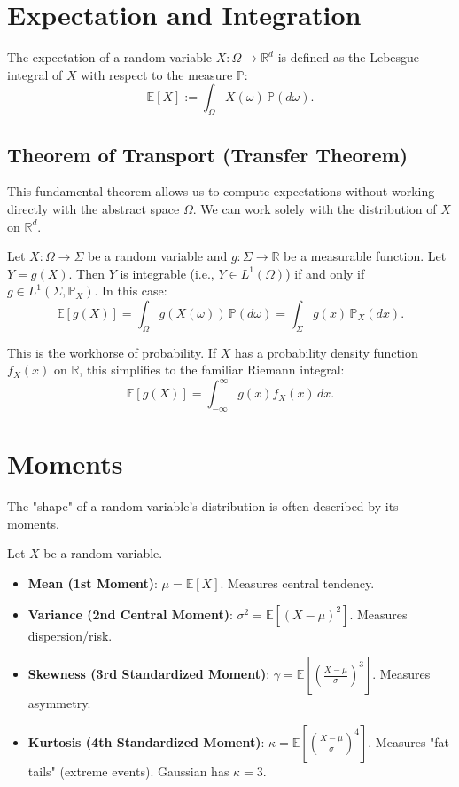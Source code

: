\section{Expectation and Integration}

\begin{definition}[Expectation]
The expectation of a random variable $X: \Omega \to \mathbb{R}^d$ is defined as the Lebesgue integral of $X$ with respect to the measure $\mathbb{P}$:
\[
\mathbb{E}[X] := \int_{\Omega} X(\omega) \, \mathbb{P}(d\omega).
\]
\end{definition}

\subsection{Theorem of Transport (Transfer Theorem)}
This fundamental theorem allows us to compute expectations without working directly with the abstract space $\Omega$. We can work solely with the distribution of $X$ on $\mathbb{R}^d$.

\begin{theorem}
Let $X: \Omega \to \Sigma$ be a random variable and $g: \Sigma \to \mathbb{R}$ be a measurable function. Let $Y = g(X)$. Then $Y$ is integrable (i.e., $Y \in L^1(\Omega)$) if and only if $g \in L^1(\Sigma, \mathbb{P}_X)$. In this case:
\[
\mathbb{E}[g(X)] = \int_{\Omega} g(X(\omega)) \, \mathbb{P}(d\omega) = \int_{\Sigma} g(x) \, \mathbb{P}_X(dx).
\]
\end{theorem}
This is the workhorse of probability. If $X$ has a probability density function $f_X(x)$ on $\mathbb{R}$, this simplifies to the familiar Riemann integral:
\[
\mathbb{E}[g(X)] = \int_{-\infty}^{\infty} g(x) f_X(x) \, dx.
\]

\section{Moments}
The "shape" of a random variable's distribution is often described by its moments.
\begin{definition}[Moments]
Let $X$ be a random variable.
\begin{itemize}
    \item \textbf{Mean (1st Moment)}: $\mu = \mathbb{E}[X]$. Measures central tendency.
    \item \textbf{Variance (2nd Central Moment)}: $\sigma^2 = \mathbb{E}[(X-\mu)^2]$. Measures dispersion/risk.
    \item \textbf{Skewness (3rd Standardized Moment)}: $\gamma = \mathbb{E}[(\frac{X-\mu}{\sigma})^3]$. Measures asymmetry.
    \item \textbf{Kurtosis (4th Standardized Moment)}: $\kappa = \mathbb{E}[(\frac{X-\mu}{\sigma})^4]$. Measures "fat tails" (extreme events). Gaussian has $\kappa=3$.
\end{itemize}
\end{definition}

